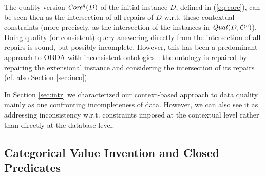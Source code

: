 \documentclass[format=acmsmall, review=false, screen=true]{acmart}
\newcommand{\ignore}[1]{}
\newcommand{\mc}[1]{\mathcal{ #1}}
\newcommand{\nit}[1]{{\it #1}}
\newcommand{\egds}{{\em egds}}
\newcommand{\ncs}{{\em ncs}}
\newcommand{\red}[1]{{#1}}
\newcommand{\blue}[1]{{#1}}
\newcommand{\comlb}[1]{{\vspace{2mm}\noindent \bf \blue{COMM(LEO):}}~ #1 \hfill {\bf
    END.}\\}
\newcommand{\commos}[1]{{\vspace{2mm}\noindent \bf \blue{COMM(MOSTAFA):}}~ #1 \hfill {\bf
    END.}\\}
\begin{document}
The quality version $\nit{Core}^q(D)$ of the initial instance $D$, defined in (\ref{eq:core}), can be seen then as the intersection of all repairs of $D$ w.r.t. these contextual constraints (more precisely, as the intersection
of the instances in $\nit{Qual}(D,\mc{O}^c)$).
Doing quality (or consistent) query answering directly from the intersection of all repairs is sound, but possibly incomplete. However, this has been a predominant approach to OBDA with inconsistent ontologies~\red{\cite{lembo15,lukasiewicz12,lukasiewicz15}}: the ontology is repaired by repairing the extensional instance and considering the intersection of its repairs (cf. also Section \ref{sec:inco}).

In Section \ref{sec:intr} we characterized our context-based approach to data quality mainly as one confronting incompleteness of data. However, we can also see it as addressing inconsistency w.r.t. constraints imposed at the contextual level rather than directly at the database level.

\ignore{
\comlb{How can we know if a MD ontology is inconsistent w.r.t. \egds? What kinds of inconsistencies can appear, both with \ncs \ and \egds? The authors of papers on ontology repairs start from the assumption that they know that there are inconsistencies and which they are?\\
More generally, I think the data-repair approach to inconsistent MD ontologies may be a very interesting research topic.}
\commos{Leo, I think generally the constraints have to be continuously be checked during the process of data generation and completion (e.g. chase). In some cases, e.g. ncs and separable egds, we might be able to postpone it to the end of data generation, or sometimes even we might be allowed to check them before starting the chase. In any case, I agree that detecting inconsistency and also the data-repair approaches for ontologies and specifically MD ontologies would be challenging.

Specially, in the data cleaning, I think there is interest in working with richer onotlogies for capturing data quality concerns of any form that immediately leads to repairing the ontologies for cleaning. Basically, data quality specification using ontologies and also cleaning it, which possibly leads to repairing ontologies.}
}

\subsection{\red{Categorical Value Invention and Closed Predicates}}\label{sec:clo}
\end{document}
